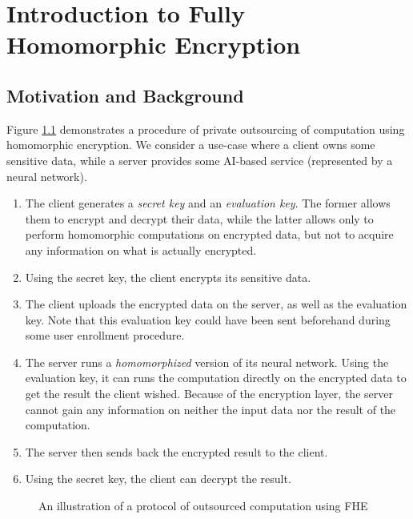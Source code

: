 
\chapter{Introduction to Fully Homomorphic Encryption}



\section{Motivation and Background}






Figure \ref{fig:classical_usage_fhe} demonstrates a procedure of private outsourcing of computation using homomorphic encryption. We consider a use-case where a client owns some sensitive data, while a server provides some AI-based service (represented by a neural network).

\begin{enumerate}
	\item The client generates a \textit{secret key} and an \textit{evaluation key}. The former allows them to encrypt and decrypt their data, while the latter allows only to perform homomorphic computations on encrypted data, but not to acquire any information on what is actually encrypted.
	\item Using the secret key, the client encrypts its sensitive data.
	\item The client uploads the encrypted data on the server, as well as the evaluation key. Note that this evaluation key could have been sent beforehand during some user enrollment procedure.
	\item The server runs a \textit{homomorphized} version of its neural network. Using the evaluation key, it can runs the computation directly on the encrypted data to get the result the client wished. Because of the encryption layer, the server cannot gain any information on neither the input data nor the result of the computation.
	\item The server then sends back the encrypted result to the client.
	\item Using the secret key, the client can decrypt the result.
\end{enumerate}


\begin{figure}
	\centering
	
	\caption{An illustration of a protocol of outsourced computation using FHE}
	\label{fig:classical_usage_fhe}
\end{figure}


